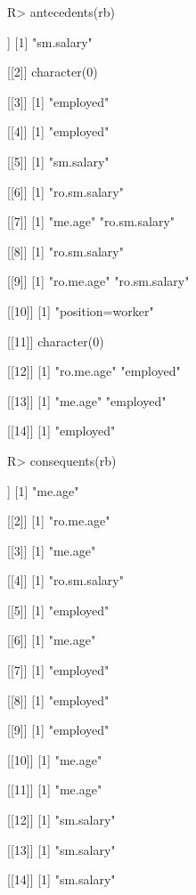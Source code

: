 \begin{Schunk}
% --begin: "searchrules4"
\begin{Sinput}
R> antecedents(rb)
\end{Sinput}
\begin{Soutput}
[[1]]
[1] "sm.salary"

[[2]]
character(0)

[[3]]
[1] "employed"

[[4]]
[1] "employed"

[[5]]
[1] "sm.salary"

[[6]]
[1] "ro.sm.salary"

[[7]]
[1] "me.age"       "ro.sm.salary"

[[8]]
[1] "ro.sm.salary"

[[9]]
[1] "ro.me.age"    "ro.sm.salary"

[[10]]
[1] "position=worker"

[[11]]
character(0)

[[12]]
[1] "ro.me.age" "employed" 

[[13]]
[1] "me.age"   "employed"

[[14]]
[1] "employed"
\end{Soutput}
\begin{Sinput}
R> consequents(rb)
\end{Sinput}
\begin{Soutput}
[[1]]
[1] "me.age"

[[2]]
[1] "ro.me.age"

[[3]]
[1] "me.age"

[[4]]
[1] "ro.sm.salary"

[[5]]
[1] "employed"

[[6]]
[1] "me.age"

[[7]]
[1] "employed"

[[8]]
[1] "employed"

[[9]]
[1] "employed"

[[10]]
[1] "me.age"

[[11]]
[1] "me.age"

[[12]]
[1] "sm.salary"

[[13]]
[1] "sm.salary"

[[14]]
[1] "sm.salary"
\end{Soutput}
%
% --end: "searchrules4"
\end{Schunk}
